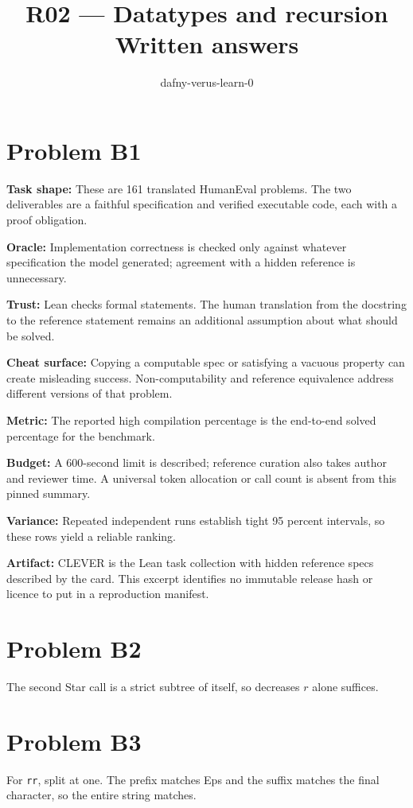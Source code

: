 \documentclass[11pt]{article}
\title{R02 --- Datatypes and recursion \\ \large Written answers}
\author{dafny-verus-learn-0}
\date{}
\begin{document}
\maketitle
\section*{Problem B1}\label{ans:B1}
\begin{answer}
\textbf{Task shape:} These are 161 translated HumanEval problems. The two deliverables are a faithful specification and verified executable code, each with a proof obligation.

\textbf{Oracle:} Implementation correctness is checked only against whatever specification the model generated; agreement with a hidden reference is unnecessary.

\textbf{Trust:} Lean checks formal statements. The human translation from the docstring to the reference statement remains an additional assumption about what should be solved.

\textbf{Cheat surface:} Copying a computable spec or satisfying a vacuous property can create misleading success. Non-computability and reference equivalence address different versions of that problem.

\textbf{Metric:} The reported high compilation percentage is the end-to-end solved percentage for the benchmark.

\textbf{Budget:} A 600-second limit is described; reference curation also takes author and reviewer time. A universal token allocation or call count is absent from this pinned summary.

\textbf{Variance:} Repeated independent runs establish tight 95 percent intervals, so these rows yield a reliable ranking.

\textbf{Artifact:} CLEVER is the Lean task collection with hidden reference specs described by the card. This excerpt identifies no immutable release hash or licence to put in a reproduction manifest.
\end{answer}
\section*{Problem B2}\label{ans:B2}
\begin{answer}
The second Star call is a strict subtree of itself, so decreases $r$ alone suffices.
\end{answer}
\section*{Problem B3}\label{ans:B3}
\begin{answer}
For \texttt{rr}, split at one. The prefix matches Eps and the suffix matches the final character, so the entire string matches.
\end{answer}
\end{document}
